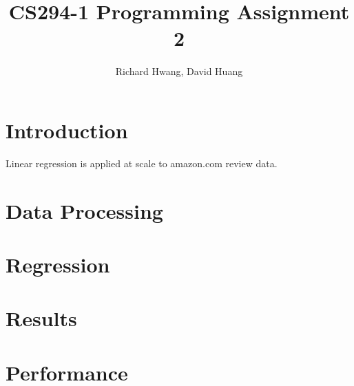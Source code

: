 \documentclass[11pt]{article}
\title{CS294-1 Programming Assignment 2}
\author{Richard Hwang, David Huang}
\begin{document}
\maketitle

\section{Introduction}
Linear regression is applied at scale to amazon.com review data.  

\section{Data Processing}

\section{Regression}

\section{Results}

\section{Performance}
\end{document}
